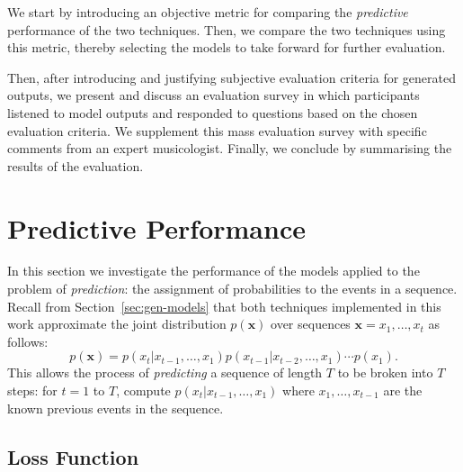 \documentclass[12pt,a4paper,twoside,openright]{report}
\newcommand{\vect}[1]{\boldsymbol{\mathbf{#1}}}
\begin{document}
\vspace{4mm}

We start by introducing an objective metric for comparing the \emph{predictive}
performance of the two techniques. Then, we compare the two techniques using
this metric, thereby selecting the models to take forward for further
evaluation. 

Then, after introducing and justifying subjective evaluation criteria for
generated outputs, we present and discuss an evaluation survey in which
participants listened to model outputs and responded to questions based on the
chosen evaluation criteria. We supplement this mass evaluation survey with
specific comments from an expert musicologist. Finally, we conclude by
summarising the results of the evaluation.

\section{Predictive Performance}

In this section we investigate the performance of the models applied to the
problem of \emph{prediction}: the assignment of probabilities to the events in a
sequence. Recall from Section~\ref{sec:gen-models} that both techniques
implemented in this work approximate the joint distribution $p(\vect{x})$ over
sequences $\vect{x} = x_1,\ldots,x_t$ as follows:
$$ p(\vect{x}) = p(x_t | x_{t-1}, \ldots, x_1) p(x_{t-1} | x_{t-2}, \ldots, x_1)
\cdots p(x_1). $$
This allows the process of \emph{predicting} a sequence of length $T$ to be
broken into $T$ steps: for $t = 1$ to $T$, compute $p(x_t | x_{t-1}, \ldots,
x_1)$ where $x_1, \ldots, x_{t-1}$ are the known previous events in the
sequence. 


\subsection{Loss Function}
\end{document}
